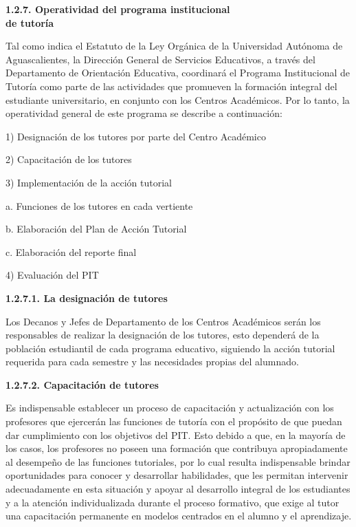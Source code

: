 \medskip
{\bfseries 1.2.7. Operatividad del programa institucional\\ de tutoría}

Tal como indica el Estatuto de la Ley Orgánica de la Universidad Autónoma de
Aguascalientes, la Dirección General de Servicios Educativos, a través del
Departamento de Orientación Educativa, coordinará el Programa Institucional
de Tutoría como parte de las actividades que promueven la formación
integral del estudiante universitario, en conjunto con los Centros
Académicos. Por lo tanto, la operatividad general de este programa se
describe a continuación:

\begin{Obs}
\item[1)] Designación de los tutores por parte del Centro Académico
\item[2)] Capacitación de los tutores
\item[3)] Implementación de la acción tutorial
\item[a.] Funciones de los tutores en cada vertiente
\item[b.] Elaboración del Plan de Acción Tutorial
\item[c.] Elaboración del reporte final
\item[4)] Evaluación del PIT
\end{Obs}


\medskip
{\bfseries 1.2.7.1. La designación de tutores}

Los Decanos y Jefes de Departamento de los Centros Académicos serán los
responsables de realizar la designación de los tutores, esto dependerá de
la población estudiantil de cada programa educativo, siguiendo la acción
tutorial requerida para cada semestre y las necesidades propias del
alumnado.


\medskip
{\bfseries 1.2.7.2. Capacitación de tutores}

\enlargethispage{1\baselineskip}
Es indispensable establecer un proceso de capacitación y actualización con
los profesores que ejercerán las funciones de tutoría con el propósito de
que puedan dar cumplimiento con los objetivos del PIT. Esto debido a que,
en la mayoría de los casos, los profesores no poseen una formación que
contribuya apropiadamente al desempeño de las funciones tutoriales, por lo
cual resulta indispensable brindar oportunidades para conocer y desarrollar
habilidades, que les permitan intervenir adecuadamente en esta situación y
apoyar al desarrollo integral de los estudiantes y a la atención
individualizada durante el proceso formativo, que exige al tutor una
capacitación permanente en modelos centrados en el alumno y el aprendizaje.

